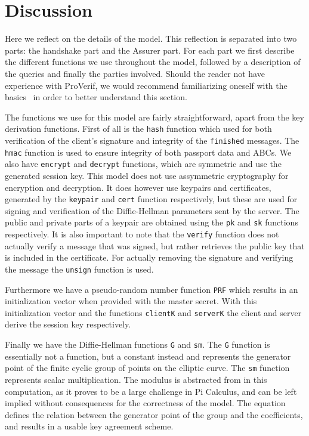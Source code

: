 \section{Discussion}
Here we reflect on the details of the model. This reflection is separated into two parts: the handshake part and the Assurer part. For each part we first describe the different functions we use throughout the model, followed by a description of the queries and finally the parties involved. Should the reader not have experience with ProVerif, we would recommend familiarizing oneself with the basics~\cite{proverifmanual} in order to better understand this section.

The functions we use for this model are fairly straightforward, apart from the key derivation functions. First of all is the \texttt{hash} function which used for both verification of the client's signature and integrity of the \texttt{finished} messages. The \texttt{hmac} function is used to ensure integrity of both passport data and ABCs. We also have \texttt{encrypt} and \texttt{decrypt} functions, which are symmetric and use the generated session key. This model does not use assymmetric cryptography for encryption and decryption. It does however use keypairs and certificates, generated by the \texttt{keypair} and \texttt{cert} function respectively, but these are used for signing and verification of the Diffie-Hellman parameters sent by the server. The public and private parts of a keypair are obtained using the \texttt{pk} and \texttt{sk} functions respectively. It is also important to note that the \texttt{verify} function does not actually verify a message that was signed, but rather retrieves the public key that is included in the certificate. For actually removing the signature and verifying the message the \texttt{unsign} function is used.

Furthermore we have a pseudo-random number function \texttt{PRF} which results in an initialization vector when provided with the master secret. With this initialization vector and the functions \texttt{clientK} and \texttt{serverK} the client and server derive the session key respectively. 

Finally we have the Diffie-Hellman functions \texttt{G} and \texttt{sm}. The \texttt{G} function is essentially not a function, but a constant instead and represents the generator point of the finite cyclic group of points on the elliptic curve. The \texttt{sm} function represents scalar multiplication. The modulus is abstracted from in this computation, as it proves to be a large challenge in Pi Calculus, and can be left implied without consequences for the correctness of the model. The equation defines the relation between the generator point of the group and the coefficients, and results in a usable key agreement scheme.

